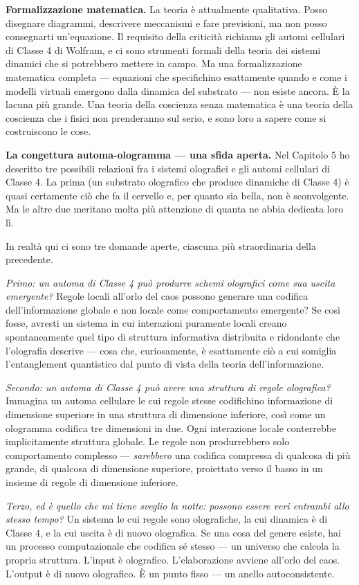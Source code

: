 \documentclass[11pt, twoside, openright]{book}
\begin{document}
\textbf{Formalizzazione matematica.} La teoria è attualmente qualitativa. Posso disegnare diagrammi, descrivere meccanismi e fare previsioni, ma non posso consegnarti un'equazione. Il requisito della criticità richiama gli automi cellulari di Classe 4 di Wolfram, e ci sono strumenti formali della teoria dei sistemi dinamici che si potrebbero mettere in campo. Ma una formalizzazione matematica completa --- equazioni che specifichino esattamente quando e come i modelli virtuali emergono dalla dinamica del substrato --- non esiste ancora. È la lacuna più grande. Una teoria della coscienza senza matematica è una teoria della coscienza che i fisici non prenderanno sul serio, e sono loro a sapere come si costruiscono le cose.

\textbf{La congettura automa-ologramma --- una sfida aperta.} Nel Capitolo 5 ho descritto tre possibili relazioni fra i sistemi olografici e gli automi cellulari di Classe 4. La prima (un substrato olografico che produce dinamiche di Classe 4) è quasi certamente ciò che fa il cervello e, per quanto sia bella, non è sconvolgente. Ma le altre due meritano molta più attenzione di quanta ne abbia dedicata loro lì.

In realtà qui ci sono tre domande aperte, ciascuna più straordinaria della precedente.

\textit{Primo: un automa di Classe 4 può produrre schemi olografici come sua uscita emergente?} Regole locali all'orlo del caos possono generare una codifica dell'informazione globale e non locale come comportamento emergente? Se così fosse, avresti un sistema in cui interazioni puramente locali creano spontaneamente quel tipo di struttura informativa distribuita e ridondante che l'olografia descrive --- cosa che, curiosamente, è esattamente ciò a cui somiglia l'entanglement quantistico dal punto di vista della teoria dell'informazione.

\textit{Secondo: un automa di Classe 4 può avere una struttura di regole olografica?} Immagina un automa cellulare le cui regole stesse codifichino informazione di dimensione superiore in una struttura di dimensione inferiore, così come un ologramma codifica tre dimensioni in due. Ogni interazione locale conterrebbe implicitamente struttura globale. Le regole non produrrebbero solo comportamento complesso --- \textit{sarebbero} una codifica compressa di qualcosa di più grande, di qualcosa di dimensione superiore, proiettato verso il basso in un insieme di regole di dimensione inferiore.

\textit{Terzo, ed è quello che mi tiene sveglio la notte: possono essere veri entrambi allo stesso tempo?} Un sistema le cui regole sono olografiche, la cui dinamica è di Classe 4, e la cui uscita è di nuovo olografica. Se una cosa del genere esiste, hai un processo computazionale che codifica sé stesso --- un universo che calcola la propria struttura. L'input è olografico. L'elaborazione avviene all'orlo del caos. L'output è di nuovo olografico. È un punto fisso --- un anello autoconsistente.
\end{document}
